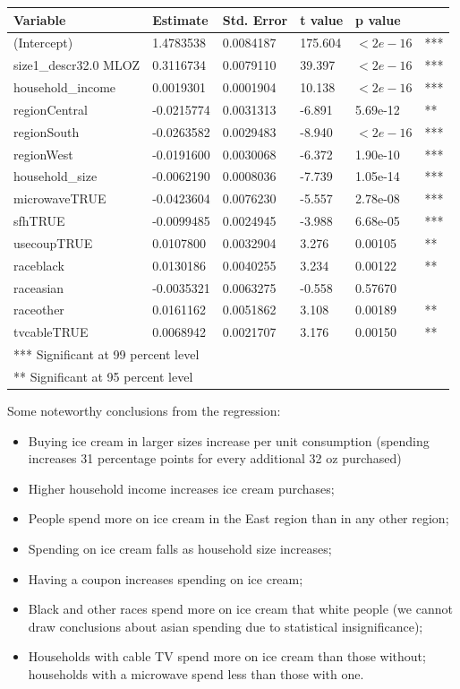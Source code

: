 \documentclass[11pt, fleqn]{article}
\begin{document}
\begin{tabular}{l l l l l l}
\toprule
  Variable            & Estimate  & Std. Error &  t value  & p value & \\ 
\midrule
(Intercept)           & 1.4783538 & 0.0084187 & 175.604 & $<2e-16$ & ***\\
size1\_descr32.0 MLOZ  & 0.3116734 & 0.0079110 & 39.397 & $<2e-16$ & *** \\
household\_income      & 0.0019301 & 0.0001904 & 10.138 & $<2e-16$ & *** \\
regionCentral         & -0.0215774 & 0.0031313 & -6.891 & 5.69e-12 & ** \\
regionSouth           & -0.0263582 & 0.0029483 & -8.940 & $<2e-16$ & *** \\
regionWest            & -0.0191600 & 0.0030068 & -6.372 & 1.90e-10 & *** \\
household\_size        & -0.0062190 & 0.0008036 & -7.739 & 1.05e-14 & *** \\
microwaveTRUE         & -0.0423604 & 0.0076230 & -5.557 & 2.78e-08 & *** \\
sfhTRUE               & -0.0099485 & 0.0024945 & -3.988 & 6.68e-05 & *** \\
usecoupTRUE           & 0.0107800 & 0.0032904 & 3.276 & 0.00105 & **  \\
raceblack             & 0.0130186 & 0.0040255 & 3.234 & 0.00122 & **  \\
raceasian             & -0.0035321 & 0.0063275 & -0.558 & 0.57670 & \\
raceother             & 0.0161162 & 0.0051862 & 3.108 & 0.00189 & **  \\
tvcableTRUE           & 0.0068942 & 0.0021707 & 3.176 & 0.00150 & **  \\
\midrule
\multicolumn{6}{l}{*** Significant at 99 percent level}\\
\multicolumn{6}{l}{** Significant at 95 percent level}\\
\bottomrule
\end{tabular}

Some noteworthy conclusions from the regression:
\begin{itemize}
  \item Buying ice cream in larger sizes increase per unit consumption (spending increases 31 percentage points for every additional 32 oz purchased)
  \item Higher household income increases ice cream purchases;
  \item People spend more on ice cream in the East region than in any other region;
  \item Spending on ice cream falls as household size increases;
  \item Having a coupon increases spending on ice cream;
  \item Black and other races spend more on ice cream that white people (we cannot draw conclusions about asian spending due to statistical insignificance);
  \item Households with cable TV spend more on ice cream than those without; households with a microwave spend less than those with one.
\end{itemize}
\end{document}
